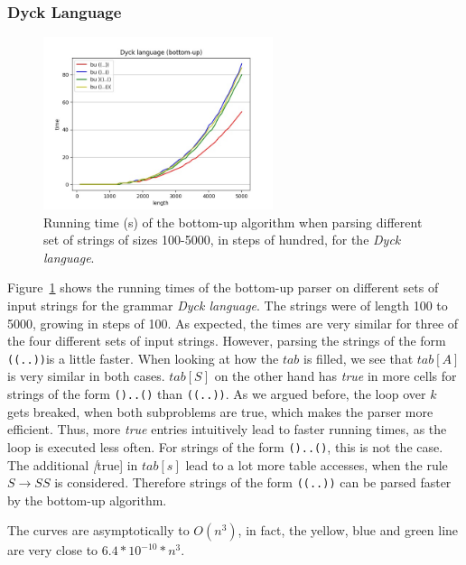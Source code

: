 \subsubsection{Dyck Language}
\label{sec:eval_dyck}

\begin{figure}[!ht]
    \centering
    \includegraphics[width=0.6\textwidth]{Resources/t_dyck_bu.jpg}
    \caption{Running time (s) of the bottom-up algorithm when parsing different set of strings of sizes 100-5000, in steps of hundred, for the \textit{Dyck language}.}
    \label{fig:t_dyck_bu}
\end{figure}

Figure~\ref{fig:t_dyck_bu} shows the running times of the bottom-up parser on different sets of input strings for the grammar \textit{Dyck language}.
The strings were of length 100 to 5000, growing in steps of 100.
As expected, the times are very similar for three of the four different sets of input strings.
However, parsing the strings of the form \texttt{\texttt{((..))}}is a little faster.
When looking at how the $tab$ is filled, we see that $tab[A]$ is very similar in both cases.
$tab[S]$ on the other hand has \textit{true} in more cells for strings of the form \texttt{()..()} than \texttt{((..))}.
As we argued before, the loop over $k$ gets breaked, when both subproblems are true, which makes the parser more efficient.
Thus, more \textit{true} entries intuitively lead to faster running times, as the loop is executed less often.
For strings of the form \texttt{()..()}, this is not the case.
The additional \textit[true] in $tab[s]$ lead to a lot more table accesses, when the rule $S\rightarrow SS$ is considered.
Therefore strings of the form \texttt{\texttt{((..))}} can be parsed faster by the bottom-up algorithm.

The curves are asymptotically to $O(n^3)$, in fact, the yellow, blue and green line are very close to $6.4*10^{-10}*n^3$.

